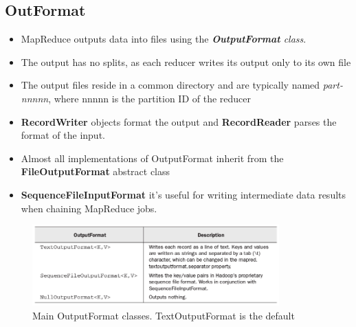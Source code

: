 \documentclass{article}
\begin{document}
\begin{multicols}{2}
\subsection{OutFormat}
\begin{itemize}
\item MapReduce outputs data into files using the \emph{\textbf{OutputFormat} class}. 
\item The output has no splits, as each reducer writes its output only to its own file
\item The output files reside in a common directory and are typically named \emph{part-nnnnn}, where nnnnn is the partition ID of the reducer
\item \textbf{RecordWriter} objects format the output and \textbf{RecordReader} parses the format of the input.
\item Almost all implementations of OutputFormat inherit from the \textbf{FileOutputFormat} abstract class
\item \textbf{SequenceFileInputFormat} it’s useful for writing intermediate data results when chaining MapReduce jobs.
\end{itemize}
\begin{figure}[H]
\centering
\includegraphics[width=9.5cm]{assets/popular_output.png}
\caption{Main OutputFormat classes. TextOutputFormat is the default}
\label{fig:awesome_image}
\end{figure}


\newpage
\pagebreak


\end{multicols}
\end{document}
